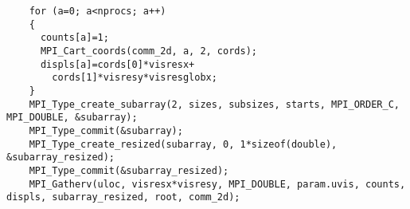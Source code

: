 \begin{frame}[fragile]
  \begin{lstlisting}
    for (a=0; a<nprocs; a++)
    {
      counts[a]=1;
      MPI_Cart_coords(comm_2d, a, 2, cords);
      displs[a]=cords[0]*visresx+
		cords[1]*visresy*visresglobx;
    }
    MPI_Type_create_subarray(2, sizes, subsizes, starts, MPI_ORDER_C, MPI_DOUBLE, &subarray);
    MPI_Type_commit(&subarray);
    MPI_Type_create_resized(subarray, 0, 1*sizeof(double), &subarray_resized);
    MPI_Type_commit(&subarray_resized);
    MPI_Gatherv(uloc, visresx*visresy, MPI_DOUBLE, param.uvis, counts, displs, subarray_resized, root, comm_2d);
  \end{lstlisting}
\end{frame}
